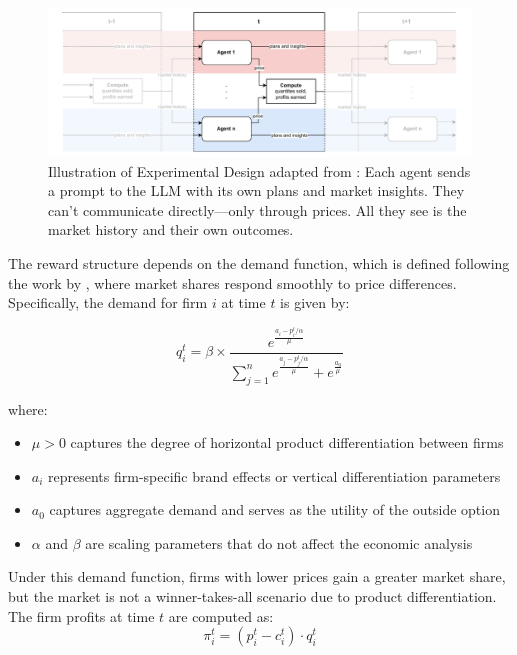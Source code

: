 \begin{figure}[htpb!]
  \centering
  \includegraphics[width=1\linewidth]{latex/imgs/illustration_diagram_experiment.pdf}
    \caption{Illustration of Experimental Design adapted from \textcite[p. 9]{fish_algorithmic_2025}: Each agent sends a prompt to the LLM with its own plans and market insights. They can't communicate directly—only through prices. All they see is the market history and their own outcomes.}
    \label{fig:experimental_design}
\end{figure}

The reward structure depends on the demand function, which is defined following the work by \textcite{calvano_artificial_2020}, where market shares respond smoothly to price differences. Specifically, the demand for firm $i$ at time $t$ is given by:

\begin{equation}\label{eq:calvano}
    q_i^t = \beta \times \frac{e^{\frac{a_i - p_i^t/\alpha}{\mu}}}{\sum_{j=1}^{n} e^{\frac{a_j - p_j^t/\alpha}{\mu}} + e^{\frac{a_0}{\mu}}}
\end{equation}

where:
\begin{itemize}
    \item $\mu > 0$ captures the degree of horizontal product differentiation between firms
    \item $a_i$ represents firm-specific brand effects or vertical differentiation parameters
    \item $a_0$ captures aggregate demand and serves as the utility of the outside option
    \item $\alpha$ and $\beta$ are scaling parameters that do not affect the economic analysis
\end{itemize}

Under this demand function, firms with lower prices gain a greater market share, but the market is not a winner-takes-all scenario due to product differentiation. The firm profits at time $t$ are computed as: 
\begin{equation}
    \pi_i^t = (p_i^t - c_i^t) \cdot q_i^t
\end{equation}

